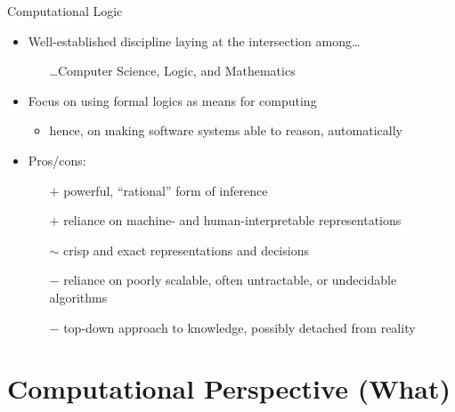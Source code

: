 \documentclass[presentation]{beamer}\mode<presentation>{\usetheme{AMSBolognaFC}}
\begin{document}

\begin{frame}{Computational Logic}
    \begin{itemize}
        \item Well-established discipline laying at the intersection among\ldots
        \begin{itemize}
            \item[] \ldots Computer Science, Logic, and Mathematics
        \end{itemize} 
        
        \vfill 
        
        \item Focus on using \alert{formal logics} as means for \alert{computing}
        \begin{itemize}
            \item hence, on making software systems able to \alert{reason}, automatically
        \end{itemize}
        
        \vfill

        \item Pros/cons:
        \begin{itemize}
            \item[$+$] powerful, ``\alert{rational}'' form of inference
            \item[$+$] reliance on machine- and human-\alert{interpretable} representations
            \item[$\sim$] \alert{crisp} and \alert{exact} representations and decisions
            \item[$-$] reliance on poorly scalable, \alert{often untractable}, or undecidable algorithms
            \item[$-$] \alert{top-down} approach to knowledge, possibly detached from reality
        \end{itemize}
    \end{itemize}
\end{frame}

\section{Computational Perspective (What)}
\end{document}
